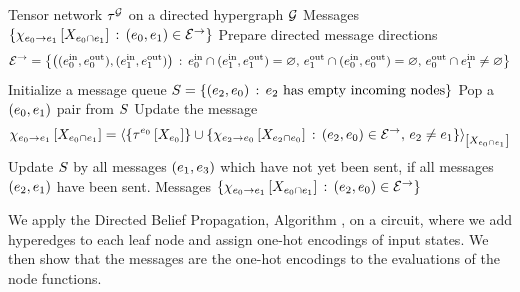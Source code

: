 \begin{algorithm}[hbt!]
    \caption{Directed Belief Propagation}\label{alg:directedBeliefPropagation}
    \begin{algorithmic}
        \Require Tensor network $\tau^{\mathcal{G}}$ on a directed hypergraph $\mathcal{G}$
        \Ensure Messages $\{\chi_{e_{0} \rightarrow e_{1}}\left[X_{e_{0} \cap e_{1}}\right]\,:\,(e_{0},e_{1})\in\mathcal{E}^{\rightarrow}\}$
        \iosepline
        \State Prepare directed message directions
        \begin{align*}
            \mathcal{E}^{\rightarrow} = \left\{
                              \big((e^{\mathrm{in}}_{0},e^{\mathrm{out}}_{0}),(e^{\mathrm{in}}_{1},e^{\mathrm{out}}_{1})\big) \,:\,
                              e^{\mathrm{in}}_{0} \cap (e^{\mathrm{in}}_{1},e^{\mathrm{out}}_{1}) = \varnothing
                              ,\,
                              e^{\mathrm{out}}_{1} \cap (e^{\mathrm{in}}_{0},e^{\mathrm{out}}_{0}) = \varnothing
                              ,\,
                              e^{\mathrm{out}}_{0} \cap e^{\mathrm{in}}_{1} \neq \varnothing
            \right\}
        \end{align*}
        \State Initialize a message queue $S=\{(e_{2},e_{0}) \,:\, e_{2} \text{ has empty incoming nodes} \}$
            \State Pop a $(e_{0},e_{1})$ pair from $S$
            \State Update the message
            \begin{align*}
                \chi_{e_{0} \rightarrow e_{1}}\left[X_{e_{0} \cap e_{1}}\right]
                = \left\langle \{\tau^{e_{0}}\left[X_{e_{0}}\right]\}
                    \cup \{\chi_{e_{2} \rightarrow e_{0}}\left[X_{e_{2}\cap e_{0}}\right] \,:\, (e_{2},e_{0})\in\mathcal{E}^{\rightarrow} ,\, e_{2}\neq e_{1}\}
                \right\rangle_{\left[ X_{e_{0}\cap e_{1}} \right]}
            \end{align*}
            \State Update $S$ by all messages $(e_{1},e_{3})$ which have not yet been sent, if all messages $(e_{2},e_{1})$ have been sent.
        \EndWhile
        \State \Return Messages $\{\chi_{e_{0} \rightarrow e_{1}}\left[X_{e_{0} \cap e_{1}}\right]\,:\,(e_{2},e_{0})\in\mathcal{E}^{\rightarrow}\}$
    \end{algorithmic}
\end{algorithm}

We apply the Directed Belief Propagation, Algorithm , on a circuit, where we add hyperedges to each leaf node and assign one-hot encodings of input states.
We then show that the messages are the one-hot encodings to the evaluations of the node functions.

